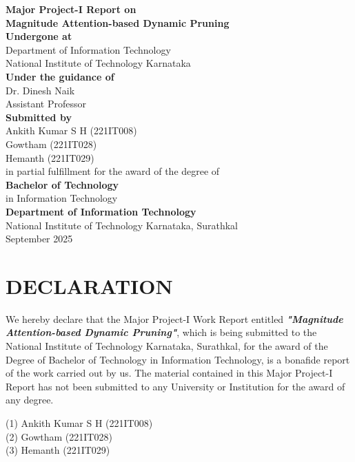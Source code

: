 \documentclass[12pt,a4paper]{report}
\newcommand{\chapterwithtoc}[1]{%
\chapter*{#1}%
\addcontentsline{toc}{chapter}{#1}}
\begin{document}
\begin{titlepage}
\centering
{\LARGE \textbf{Major Project-I Report on}}\\[0.5cm]
{\Huge \textbf{Magnitude Attention-based Dynamic Pruning}}\\[0.8cm] %
\textbf{Undergone at}\\[0.5cm]
Department of Information Technology\\
National Institute of Technology Karnataka\\[0.8cm] %
\textbf{Under the guidance of}\\
Dr. Dinesh Naik\\
Assistant Professor\\[0.8cm] %
\textbf{Submitted by}\\
Ankith Kumar S H (221IT008)\\
Gowtham (221IT028)\\
Hemanth (221IT029)\\[0.8cm] %
in partial fulfillment for the award of the degree of\\
\textbf{Bachelor of Technology}\\
in Information Technology\\[0.5cm] %
\textbf{Department of Information Technology}\\
National Institute of Technology Karnataka, Surathkal\\[0.5cm]
September 2025
\end{titlepage}

\clearpage %

\chapterwithtoc{DECLARATION}

We hereby declare that the Major Project-I Work Report entitled \textbf{\textit{"Magnitude Attention-based Dynamic Pruning"}}, which is being submitted to the National Institute of Technology Karnataka, Surathkal, for the award of the Degree of Bachelor of Technology in Information Technology, is a bonafide report of the work carried out by us. The material contained in this Major Project-I Report has not been submitted to any University or Institution for the award of any degree.
\vspace{1cm}

\noindent
(1) Ankith Kumar S H (221IT008) \\
(2) Gowtham (221IT028) \\
(3) Hemanth (221IT029) \\
\vspace{1cm}
\end{document}
